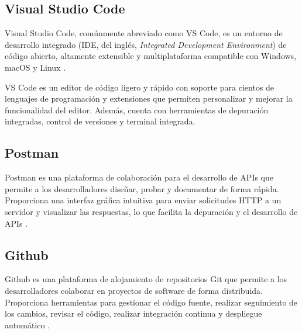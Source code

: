 \subsection{Visual Studio Code}

Visual Studio Code, comúnmente abreviado como VS Code, es un entorno de
desarrollo integrado (IDE, del inglés, \textit{Integrated Development Environment}) de
código abierto, altamente extensible y multiplataforma compatible con Windows,
macOS y Linux \cite{VSCode}.

VS Code es un editor de código ligero y rápido con soporte para cientos de
lenguajes de programación y extensiones que permiten personalizar y mejorar la
funcionalidad del editor. Además, cuenta con herramientas de depuración
integradas, control de versiones y terminal integrada.

\subsection{Postman}

Postman es una plataforma de colaboración para el desarrollo de APIs que
permite a los desarrolladores diseñar, probar y documentar de forma rápida.
Proporciona una interfaz gráfica intuitiva para enviar solicitudes HTTP a un
servidor y visualizar las respuestas, lo que facilita la depuración y el
desarrollo de APIs \cite{Postman}.



\subsection{Github}

Github es una plataforma de alojamiento de repositorios Git \cite{Git} que
permite a los desarrolladores colaborar en proyectos de software de forma
distribuida. Proporciona herramientas para gestionar el código fuente, realizar
seguimiento de los cambios, revisar el código, realizar integración continua y
despliegue automático \cite{Github}.

